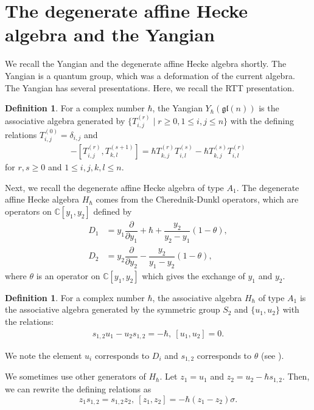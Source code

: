 \documentclass{article}
\theoremstyle{definition}
\newtheorem{Definition}[equation]{Definition}
\theoremstyle{remark}
\numberwithin{equation}{section}
\numberwithin{equation}{section}
\begin{document}
\section{The degenerate affine Hecke algebra and the Yangian}
We recall the Yangian and the degenerate affine Hecke algebra shortly. The Yangian is a quantum group, which was a deformation of the current algebra. The Yangian has several presentations. Here, we recall the RTT presentation.
\begin{Definition}
For a complex number $\hbar$, the Yangian $Y_\hbar(\mathfrak{gl}(n))$ is the associative algebra generated by $\{T^{(r)}_{i,j}\mid r\geq0,1\leq i,j\leq n\}$ with the defining relations $T^{(0)}_{i,j}=\delta_{i,j}$ and 
\begin{gather*}
[T^{(r+1)}_{i,j},T^{(s)}_{k,l}]-[T^{(r)}_{i,j},T^{(s+1)}_{k,l}]=\hbar T^{(r)}_{k,j}T^{(s)}_{i,l}-\hbar T^{(s)}_{k,j}T^{(r)}_{i,l}
\end{gather*}
for $r,s\geq0$ and $1\leq i,j,k,l\leq n$.
\end{Definition}



Next, we recall the degenerate affine Hecke algebra of type $A_1$. The degenerate affine Hecke algebra $H_\hbar$ comes from the Cherednik-Dunkl operators, which are operators on $\mathbb{C}[y_1,y_2]$ defined by
\begin{align*}
D_{1}&=y_{1}\dfrac{\partial}{\partial y_{1}}+\hbar+\dfrac{y_{2}}{y_{2}-y_{1}}(1-\theta),\\
D_{2}&=y_{2}\dfrac{\partial}{\partial y_{2}}-\dfrac{y_{2}}{y_{1}-y_{2}}(1-\theta),
\end{align*}
where $\theta$ is an operator on $\mathbb{C}[y_1,y_2]$ which gives the exchange of $y_1$ and $y_2$. 
\begin{Definition}
For a complex number $\hbar$, the associative algebra $H_\hbar$ of type $A_1$ is the associative algebra generated by the symmetric group $S_2$ and $\{u_1,u_2\}$ with the relations:
\begin{gather*}
s_{1,2}u_1-u_2s_{1,2}=-\hbar,\ 
[u_1,u_2]=0.
\end{gather*}
\end{Definition}
We note the element $u_i$ corresponds to $D_{i}$ and $s_{1,2}$ corresponds to $\theta$ (see \cite{Ch}). 

We sometimes use other generators of $H_\hbar$. Let $z_1=u_1$ and $z_2=u_2-\hbar s_{1,2}$. Then, we can rewrite the defining relations as
\begin{equation}
z_1s_{1,2}=s_{1,2}z_2,\ [z_1,z_2]=-\hbar(z_1-z_2)\sigma.
\end{equation}
\end{document}
